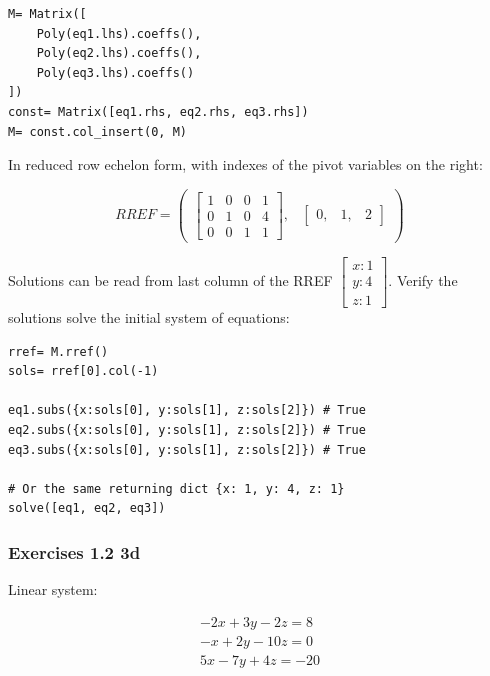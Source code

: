 \documentclass[a4paper]{article}
\begin{document}
\begin{verbatim}
M= Matrix([
    Poly(eq1.lhs).coeffs(),
    Poly(eq2.lhs).coeffs(),
    Poly(eq3.lhs).coeffs()
])
const= Matrix([eq1.rhs, eq2.rhs, eq3.rhs])
M= const.col_insert(0, M)
\end{verbatim}

In reduced row echelon form, with indexes of the pivot variables on the right:

\begin{equation}\label{eq:na}
RREF= \begin{pmatrix}\left[\begin{matrix}1 & 0 & 0 & 1\\0 & 1 & 0 & 4\\0 & 0 & 1 & 1\end{matrix}\right], & \begin{bmatrix}0, & 1, & 2\end{bmatrix}\end{pmatrix}
\end{equation}

Solutions can be read from last column of the RREF $\left[\begin{matrix}x:1\\y:4\\z:1\end{matrix}\right]$. Verify the solutions solve
the initial system of equations:

\begin{verbatim}
rref= M.rref()
sols= rref[0].col(-1)

eq1.subs({x:sols[0], y:sols[1], z:sols[2]}) # True
eq2.subs({x:sols[0], y:sols[1], z:sols[2]}) # True
eq3.subs({x:sols[0], y:sols[1], z:sols[2]}) # True

# Or the same returning dict {x: 1, y: 4, z: 1}
solve([eq1, eq2, eq3]) 
\end{verbatim}

\subsubsection{Exercises 1.2 3d}

Linear system:

\begin{equation}\label{eq:na}
\begin{matrix}
    - 2 x + 3 y - 2 z = 8 \\
    - x + 2 y - 10 z = 0 \\
    5 x - 7 y + 4 z = -20
\end{matrix}
\end{equation}
\end{document}

